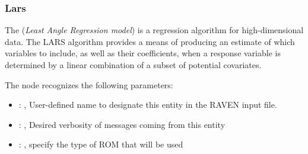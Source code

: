 \subsubsection{Lars}
  The  (\textit{Least Angle Regression model})                         is a regression
  algorithm for high-dimensional data.                         The LARS algorithm provides a means
  of producing an estimate of which variables                         to include, as well as their
  coefficients, when a response variable is                         determined by a linear
  combination of a subset of potential covariates.

  The  node recognizes the following parameters:
    \begin{itemize}
      \item {}: , 
        User-defined name to designate this entity in the RAVEN input file.
      \item {}: , 
        Desired verbosity of messages coming from this entity
      \item {}: , 
        specify the type of ROM that will be used
  \end{itemize}

